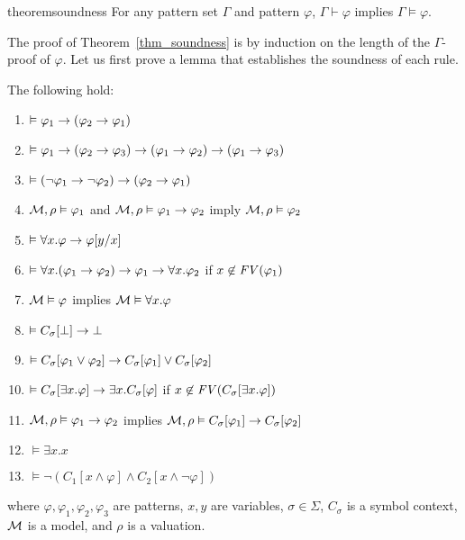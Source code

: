 \documentclass{amsart}
\begin{document}
\begin{restatable}[Soundness]{theorem}{soundness}
\label{thm_soundness}
For any pattern set $\Gamma$ and pattern $\varphi$,
$\Gamma \vdash \varphi$ implies $\Gamma \vDash \varphi$.
\end{restatable}
The proof of Theorem~\ref{thm_soundness} is by induction on the
length of the $\Gamma$-proof of $\varphi$.
Let us first prove a lemma that establishes
the soundness of each rule.

\begin{lemma}
\label{lemma_soundness_lemma}
The following hold:
\begin{enumerate}
	\item $ \vDash \varphi_1 \to (\varphi_2 \to \varphi_1)$
	\item $ \vDash \varphi_1 \to (\varphi_2 \to \varphi_3)
	\to (\varphi_1 \to \varphi_2)
	\to (\varphi_1 \to \varphi_3)$
	\item $ \vDash (\neg \varphi_1 \to \neg \varphi_2)
	\to (\varphi_2 \to \varphi_1)$
	\item $ \mathcal{M},\rho \vDash \varphi_1$ and
	$ \mathcal{M},\rho \vDash \varphi_1 \to \varphi_2$
	imply
	$ \mathcal{M},\rho \vDash \varphi_2$
	\item $ \vDash \forall x . \varphi \to \varphi[y/x]$
	\item $ \vDash \forall x . (\varphi_1 \to \varphi_2)
	\to \varphi_1 \to \forall x . \varphi_2$
	if $x \not\in \mathit{FV}(\varphi_1)$
	\item $ \mathcal{M} \vDash \varphi$
	implies
	$ \mathcal{M} \vDash \forall x . \varphi$
	\item $ \vDash C_{\sigma}[\bot] \to \bot$
	\item $ \vDash C_{\sigma}[\varphi_1 \vee \varphi_2]
	\to C_{\sigma}[\varphi_1] 
	\vee C_{\sigma}[\varphi_2]$
	\item $ \vDash C_{\sigma}[\exists x . \varphi]
	\to \exists x . C_{\sigma}[\varphi]$
	if $x \not\in \mathit{FV}(C_{\sigma}[\exists x . \varphi])$
	\item $ \mathcal{M},\rho \vDash \varphi_1 \to \varphi_2$
	implies
	$ \mathcal{M},\rho \vDash C_{\sigma}[\varphi_1] 
	\to C_{\sigma}[\varphi_2]$
	\item $ \vDash \exists x . x$
	\item $ \vDash \neg (C_1[x \wedge \varphi] 
	\wedge C_2[x \wedge \neg \varphi])$
\end{enumerate}
where $\varphi,\varphi_1,\varphi_2,\varphi_3$ are patterns, 
$x,y$ are variables,
$\sigma \in \Sigma$,
$C_\sigma$ is a symbol context,
$\mathcal{M}$ is a model,
and $\rho$ is a valuation.
\end{lemma}
\end{document}
